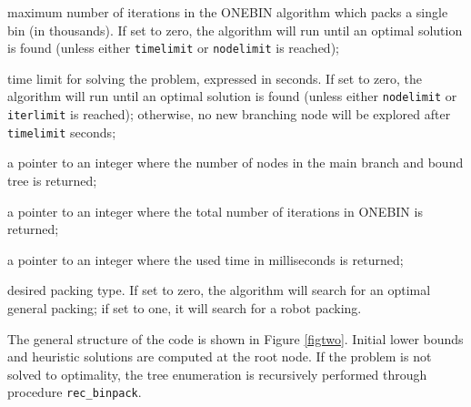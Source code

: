 \noindent
{}
\parbox[t]{13.0cm}{maximum number of iterations in the ONEBIN algorithm
which packs a single bin (in thousands).
If set to zero, the algorithm will run until an optimal solution is
found ({unless either} {\tt timelimit} or {\tt nodelimit} is reached);}
\medskip

\noindent
{}
\parbox[t]{13.0cm}{time limit for solving the problem,
expressed in seconds. If set to zero, the algorithm will run until
an optimal solution is found ({unless either} {\tt nodelimit} or {\tt iterlimit} is reached);
otherwise, no new branching node will be explored after {\tt
timelimit} seconds;}
\medskip

\noindent
{}
\parbox[t]{13.0cm}{a pointer to an integer where the number
of {nodes in the main branch and bound tree} is returned;}
\medskip

\noindent
{}
\parbox[t]{13.0cm}{a pointer to an integer where the {total} number
of iterations in ONEBIN is returned;}
\medskip

\noindent
{}
\parbox[t]{13.0cm}{a pointer to an integer where the used time
in milliseconds is returned;}
\medskip

\noindent
{}
\parbox[t]{13.0cm}{desired packing type. If set to zero, the
algorithm will search for an optimal general packing; if set to
one, it will search for a robot packing.}
\medskip

\noindent
{The general structure of the code is shown in Figure \ref{figtwo}.
Initial lower bounds and heuristic solutions are computed at the root
node. If the problem is not solved to optimality, the tree enumeration
is recursively performed through procedure {\tt rec\_binpack}.
   }

